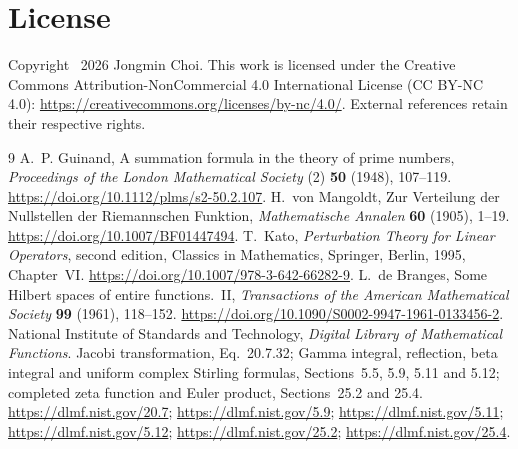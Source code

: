 \documentclass[11pt,a4paper]{article}
\numberwithin{equation}{section}
\theoremstyle{definition}\newtheorem{definition}[theorem]{Definition}
\theoremstyle{remark}\newtheorem{remark}[theorem]{Remark}
\begin{document}
\section*{License}
Copyright \textcopyright\ 2026 Jongmin Choi. This work is licensed under the Creative Commons Attribution-NonCommercial 4.0 International License (CC BY-NC 4.0): \url{https://creativecommons.org/licenses/by-nc/4.0/}. External references retain their respective rights.

\begin{thebibliography}{9}
A.~P. Guinand, A summation formula in the theory of prime numbers,
\emph{Proceedings of the London Mathematical Society} (2) \textbf{50} (1948), 107--119.
\url{https://doi.org/10.1112/plms/s2-50.2.107}.
H.~von Mangoldt, Zur Verteilung der Nullstellen der Riemannschen Funktion,
\emph{Mathematische Annalen} \textbf{60} (1905), 1--19.
\url{https://doi.org/10.1007/BF01447494}.
T.~Kato, \emph{Perturbation Theory for Linear Operators}, second edition,
Classics in Mathematics, Springer, Berlin, 1995, Chapter~VI.
\url{https://doi.org/10.1007/978-3-642-66282-9}.
L.~de Branges, Some Hilbert spaces of entire functions.~II,
\emph{Transactions of the American Mathematical Society} \textbf{99} (1961), 118--152.
\url{https://doi.org/10.1090/S0002-9947-1961-0133456-2}.
National Institute of Standards and Technology, \emph{Digital Library of Mathematical Functions}.
Jacobi transformation, Eq.~20.7.32; Gamma integral, reflection, beta integral and uniform complex Stirling formulas, Sections~5.5, 5.9, 5.11 and 5.12; completed zeta function and Euler product, Sections~25.2 and 25.4.
\url{https://dlmf.nist.gov/20.7}; \url{https://dlmf.nist.gov/5.9};
\url{https://dlmf.nist.gov/5.11}; \url{https://dlmf.nist.gov/5.12};
\url{https://dlmf.nist.gov/25.2}; \url{https://dlmf.nist.gov/25.4}.
\end{thebibliography}
\end{document}
